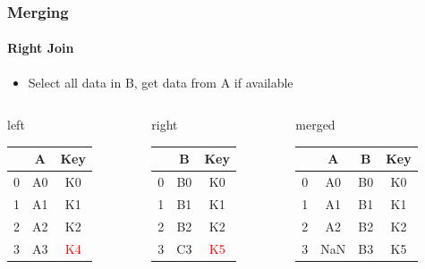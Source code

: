 \documentclass[ngerman]{beamer}
\def\firstcircle{(0,0) circle (2cm)}
\def\secondcircle{(0:3cm) circle (2cm)}
\begin{document}
\begin{frame}
\frametitle{Merging}
\framesubtitle{Right Join}

\begin{itemize}
\item Select all data in B, get data from A if available
\end{itemize}

\begin{center}

\end{center}

{\footnotesize
\begin{columns}
\begin{column}{0.3\textwidth}
left \\
\begin{tabular}{c|cc} \toprule
   & A  &  Key \\ \midrule
0 & A0 &  K0 \\
1 & A1 &  K1 \\ 
2 & A2 &  K2 \\
3 & A3 &  \textcolor{red}{K4} \\ \bottomrule
\end{tabular}
\end{column}
\begin{column}{0.3\textwidth}
right \\
\begin{tabular}{c|cc} \toprule
   &  B   & Key \\ \midrule
0 &  B0 & K0 \\
1 &  B1 & K1 \\ 
2 &  B2 & K2 \\
3 &  C3 & \textcolor{red}{K5} \\ \bottomrule
\end{tabular}\end{column}
\begin{column}{0.3\textwidth}
merged \\
\begin{tabular}{c|ccc} \toprule
   & A  & B   & Key \\ \midrule
0 & A0 & B0 & K0 \\
1 & A1 & B1 & K1 \\ 
2 & A2 & B2 & K2 \\ 
3 & NaN & B3 & K5 \\ \bottomrule
\end{tabular} \\
\vspace*{0.4em}
\end{column}
\end{columns}}

\end{frame}
\end{document}
